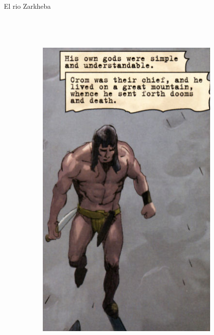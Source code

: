 \begin{frame}{El rio Zarkheba}
\begin{columns}
\begin{figure}[htp]
			~
			\begin{subfigure}[b]{0.27\textwidth}
				\includegraphics[width=\textwidth]{img/conan/DH}
			\end{subfigure}
			~
			\begin{subfigure}[b]{0.23\textwidth}

\end{subfigure}
\end{figure}
\end{columns}
\end{frame}
